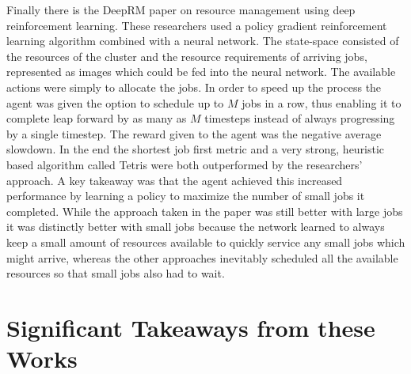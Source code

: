 Finally there is the DeepRM paper on resource management using deep reinforcement learning. These researchers used a policy gradient reinforcement learning algorithm combined with a neural network. The state-space consisted of the resources of the cluster and the resource requirements of arriving jobs, represented as images which could be fed into the neural network. The available actions were simply to allocate the jobs. In order to speed up the process the agent was given the option to schedule up to $M$ jobs in a row, thus enabling it to complete leap forward by as many as $M$ timesteps instead of always progressing by a single timestep. The reward given to the agent was the negative average slowdown. In the end the shortest job first metric and a very strong, heuristic based algorithm called Tetris were both outperformed by the researchers' approach. A key takeaway was that the agent achieved this increased performance by learning a policy to maximize the number of small jobs it completed. While the approach taken in the paper was still better with large jobs it was distinctly better with small jobs because the network learned to always keep a small amount of resources available to quickly service any small jobs which might arrive, whereas the other approaches inevitably scheduled all the available resources so that small jobs also had to wait.

\section{Significant Takeaways from these Works}
\label{sec:takeaways}

